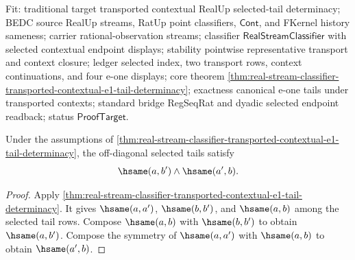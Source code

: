 Fit: traditional target transported contextual RealUp selected-tail
determinacy; BEDC source RealUp streams, RatUp point classifiers,
$\mathsf{Cont}$, and FKernel history sameness; carrier rational-observation
streams; classifier $\mathsf{RealStreamClassifier}$ with selected contextual
endpoint displays; stability pointwise representative transport and context
closure; ledger selected index, two transport rows, context continuations, and
four e-one displays; core theorem
\autoref{thm:real-stream-classifier-transported-contextual-e1-tail-determinacy};
exactness canonical e-one tails under transported contexts; standard bridge
RegSeqRat and dyadic selected endpoint readback; status
$\mathsf{ProofTarget}$.

\begin{theorem}
\label{thm:real-stream-classifier-transported-contextual-e1-tail-cross-hsame}
Under the assumptions of
\autoref{thm:real-stream-classifier-transported-contextual-e1-tail-determinacy},
the off-diagonal selected tails satisfy
$$
\hsame(a,b')\land\hsame(a',b).
$$
\end{theorem}
\begin{proof}
Apply
\autoref{thm:real-stream-classifier-transported-contextual-e1-tail-determinacy}.
It gives $\hsame(a,a')$, $\hsame(b,b')$, and $\hsame(a,b)$ among the selected
tail rows. Compose $\hsame(a,b)$ with $\hsame(b,b')$ to obtain
$\hsame(a,b')$. Compose the symmetry of $\hsame(a,a')$ with $\hsame(a,b)$ to
obtain $\hsame(a',b)$.
\end{proof}

